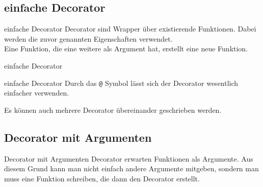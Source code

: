 \subsection{einfache Decorator}
\begin{frame}{einfache Decorator}
	Decorator sind Wrapper über existierende Funktionen. Dabei werden die zuvor genannten Eigenschaften verwendet.\\
	Eine Funktion, die eine weitere als Argument hat, erstellt eine neue Funktion.
	
\end{frame}
\begin{frame}{einfache Decorator}
	
\end{frame}

\begin{frame}[fragile]{einfache Decorator}
	Durch das \alert{\texttt{@} Symbol} lässt sich der Decorator wesentlich einfacher verwenden.
	
	Es können auch mehrere Decorator übereinander geschrieben werden.
\end{frame}

\subsection{Decorator mit Argumenten}
\begin{frame}{Decorator mit Argumenten}
	Decorator erwarten Funktionen als Argumente. Aus diesem Grund kann man nicht einfach andere Argumente mitgeben, sondern man muss eine Funktion schreiben, die dann den Decorator erstellt.
	
\end{frame}
	

